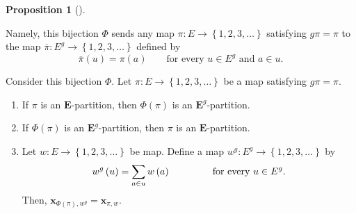 \documentclass[numbers=enddot,12pt,final,onecolumn,notitlepage,abstracton]{scrartcl}
\theoremstyle{definition}
\newtheorem{prop}[theo]{Proposition}
\newenvironment{proposition}[1][]
{\begin{prop}[#1]\begin{leftbar}}
{\end{leftbar}\end{prop}}
\let\sumnonlimits\sum
\renewcommand{\sum}{\sumnonlimits\limits}
\newenvironment{verlong}{}{}
\newcommand{\xx}{{\mathbf{x}}}
\newcommand{\EE}{{\mathbf{E}}}
\begin{document}
\begin{proposition}
\begin{verlong}
Namely, this bijection $\Phi$ sends any map
$\pi:E\rightarrow\left\{  1,2,3,\ldots \right\}  $ satisfying $g\pi=\pi$
to the map $\overline{\pi}:E^{g}
\rightarrow\left\{  1,2,3,\ldots\right\}  $ defined by
\[
\overline{\pi}\left( u \right)
= \pi\left( a \right)
\qquad\text{for every } u \in E^{g} \text{ and } a \in u.
\]
\end{verlong}

Consider this bijection $\Phi$. Let
$\pi:E\rightarrow\left\{  1,2,3,\ldots\right\}  $ be a
map satisfying $g\pi=\pi$.

\begin{enumerate}
\item[(a)] If $\pi$ is an $\EE$-partition, then $\Phi\left(
\pi\right)  $ is an $ \EE ^{g}$-partition.

\item[(b)] If $\Phi\left(  \pi\right)  $ is an
$\EE^{g}$-partition, then $\pi$ is an $\EE$-partition.

\item[(c)] Let $w : E \to \left\{1,2,3,\ldots\right\}$ be
map. Define a map $w^{g}:E^{g}\rightarrow
\left\{1,2,3,\ldots\right\}$
by
\[
w^{g}\left(  u\right)  =\sum\limits_{a\in u}w\left(
a\right)  \qquad \qquad \text{ for every } u \in E^g .
\]
Then, $\xx_{\Phi\left(  \pi\right)  ,w^{g}}
=\xx_{\pi,w}$.

\end{enumerate}
\end{proposition}
\end{document}
